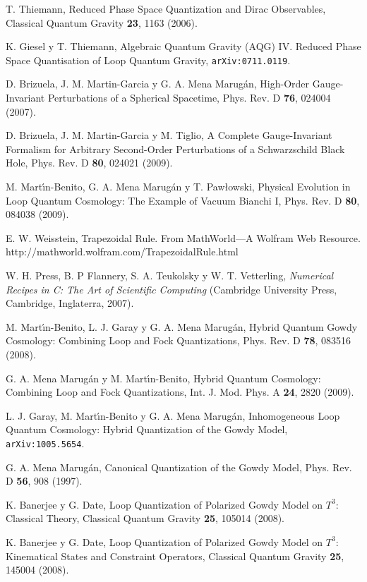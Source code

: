 \begin{thebibliography}{999}
  T. Thiemann, Reduced Phase Space Quantization and Dirac Observables,
Classical Quantum Gravity {\bf23}, 1163 (2006).

 K. Giesel y T. Thiemann, Algebraic Quantum Gravity (AQG) IV. Reduced Phase
Space Quantisation of Loop Quantum Gravity, \texttt{arXiv:0711.0119}.

 D. Brizuela, J. M. Martin-Garcia y G. A. Mena Marug\'an, High-Order
Gauge-Invariant Perturbations of a Spherical Spacetime, Phys. Rev. D {\bf76}, 024004 (2007).

 D. Brizuela, J. M. Martin-Garcia y M. Tiglio, A Complete Gauge-Invariant
Formalism for Arbitrary Second-Order Perturbations of a Schwarzschild Black Hole, Phys.
Rev. D {\bf80}, 024021 (2009).

 M. Mart\'{\i}n-Benito, G. A. Mena Marug\'{a}n y T. Paw{\l}owski, Physical Evolution
in Loop Quantum Cosmology: The Example of Vacuum Bianchi I,
Phys. Rev. D {\bf80}, 084038 (2009).

 E. W. Weisstein, Trapezoidal Rule. From MathWorld---A Wolfram Web
Resource. http://mathworld.wolfram.com/TrapezoidalRule.html 

 W. H. Press, B. P Flannery, S. A. Teukolsky y W. T. Vetterling, {\it{Numerical Recipes
in
C: The Art of Scientific Computing}} (Cambridge University Press, Cambridge, Inglaterra, 2007).

 M. Mart\'{\i}n-Benito, L. J. Garay y G. A. Mena Marug\'{a}n, Hybrid Quantum Gowdy
Cosmology: Combining Loop and Fock Quantizations, Phys. Rev. D \textbf{78}, 083516 (2008).

 G. A. Mena Marug\'{a}n y M. Mart\'{\i}n-Benito,  Hybrid Quantum Cosmology:
Combining Loop and Fock Quantizations, Int. J. Mod. Phys. A {\bf24}, 2820
(2009).

 L. J. Garay, M. Mart\'{\i}n-Benito y G. A. Mena Marug\'{a}n, Inhomogeneous Loop
Quantum Cosmology: Hybrid Quantization of the Gowdy Model, \texttt{arXiv:1005.5654}.

 G. A. Mena Marug\'{a}n, Canonical Quantization of the Gowdy Model, Phys. Rev. 
D {\bf56}, 908 (1997).

 K. Banerjee y G. Date, Loop Quantization of Polarized Gowdy Model on $T^3$:
Classical Theory, Classical Quantum Gravity {\bf25}, 105014 (2008).

 K. Banerjee y G. Date, Loop Quantization of Polarized Gowdy Model on $T^3$:
Kinematical States and Constraint Operators, Classical Quantum Gravity {\bf25}, 145004 (2008).


\end{thebibliography}
